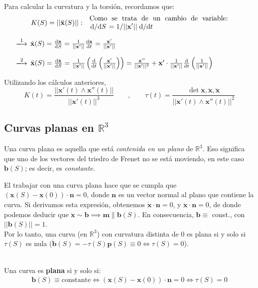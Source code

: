 Para calcular la curvatura y la torsión, recordamos que:
\begin{align*}
    K(S)=||\ddot{\mathbf{x}}(S)||&:&\text{\parbox{7cm}{Como se trata de un cambio de variable: $\dv*{}{S}=1/||\mathbf{x'}||\dv*{}{t}$}}
\end{align*}
\begin{enumerate}
    \item[$\xlongrightarrow{1}$]$\dot{\mathbf{x}}(S)=\dv{\mathbf{x}}{S}=\frac{1}{||\mathbf{x'}||}\dv{\mathbf{x}}{t}=\frac{\mathbf{x'}}{||\mathbf{x'}||}$ 

    \item[$\xlongrightarrow{2}$]$\ddot{\mathbf{x}}(S)=\dv{\dot{\mathbf{x}}}{S}=\frac{1}{||\mathbf{x'}||} \left ( \dv{}{t}\left ( \frac{\mathbf{x'}}{||\mathbf{x'}||} \right ) \right )=\frac{\mathbf{x''}}{||\mathbf{x'}||^2}+\mathbf{x'}\cdot \frac{1}{||\mathbf{x'}||} \dv{}{t}\left ( \frac{1}{||\mathbf{x'}||} \right )$
\end{enumerate}

Utilizando los cálculos anteriores,
$$
K(t)=\frac{||\mathbf{x'}(t)\wedge \mathbf{x''}(t)||}{||\mathbf{x'}(t)||^3} \qquad , \qquad \tau(t)=\frac{\det{\dot{\mathbf{x}},\ddot{\mathbf{x}},\dddot{\mathbf{x}}}}{||\mathbf{x'}(t)\wedge \mathbf{x''}(t)||^2}
$$

\subsection{Curvas planas en $\mathbb{R}^3$}
Una curva plana es aquella que está \emph{contenida en un plano} de $\mathbb{R}^3$. Eso significa que uno de los vectores del triedro de Frenet no se está moviendo, en este caso $\mathbf{b}(S)$; es decir, es \emph{constante}.

El trabajar con una curva plana hace que se cumpla que $(\mathbf{x}(S)-\mathbf{x}(0))\cdot \mathbf{n}=0$, donde $\mathbf{n}$ es un vector normal al plano que contiene la curva. Si derivamos esta expresión, obtenemos $\dot{\mathbf{x}}\cdot \mathbf{n}=0$, y $\ddot{\mathbf{x}}\cdot \mathbf{n}=0$, de donde podemos deducir que $\ddot{\mathbf{x}}\sim \mathbf{b} \implies \mathbf{m} \parallel \mathbf{b}(S)$. En consecuencia, $\mathbf{b}\equiv $ const., con $||\mathbf{b}(S)||=1$. \\

Por lo tanto, una curva (en $\mathbb{R}^3$) con curvatura distinta de 0 es plana si y solo si $\tau(S)$ es nula ($\dot{\mathbf{b}}(S)=-\tau(S)\mathbf{p}(S)\equiv 0 \iff \tau(S)=0$).
\begin{mybox}
    \begin{center}
     \\
    \vspace{0.3cm}
    Una curva es \textbf{plana} si y solo si:
    \begin{gather*}
        \mathbf{b}(S)\equiv \text{constante}
        \iff 
        (\mathbf{x}(S)-\mathbf{x}(0))\cdot \mathbf{n}=0
       \iff 
        \tau(S)=0
    \end{gather*}
    \end{center}
\end{mybox}

